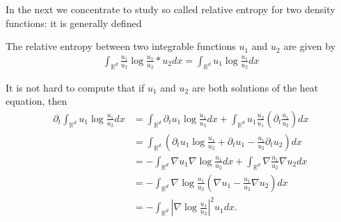 In the next we concentrate to study so called relative entropy for two density functions: it is generally defined
\begin{definition}
The relative entropy between two integrable functions $u_1$ and $u_{2}$ are given by
\begin{align*}
\int_{\mathbb{R}^{d} }\frac{u_{1}}{u_{2}} \log \frac{u_{1}}{u_{2}}*u_{2} dx=\int_{\mathbb{R}^{d} }{u_{1}} \log \frac{u_{1}}{u_{2}} dx
\end{align*}
\end{definition}
\begin{remark}
	It is not hard to compute that if $u_1$ and $u_2$ are both solutions of the heat equation, then
\begin{align*}
   \partial_t \int_{\mathbb{R}^{d} } u_{1} \log \frac{u_{1}}{u_{2}}dx&= \int_{\mathbb{R}^{d} } \partial_t u_{1} \log \frac{u_{1}}{u_{2}}dx + \int_{\mathbb{R}^{d} } u_{1} \frac{u_{2}}{u_{1}}(\partial_t \frac{u_{1}}{u_{2}})dx \\
   &=\int_{\mathbb{R}^{d} } (\partial_t u_{1} \log \frac{u_{1}}{u_{2}}+\partial_t u_1-\frac{u_{1}}{u_{2}}\partial_t u_2 ) dx\\
   &=- \int_{\mathbb{R}^{d} } \nabla u_{1} \nabla\log \frac{u_{1}}{u_{2}}dx+ \int_{\mathbb{R}^{d} } \nabla\frac{u_{1}}{u_{2}}\nabla u_2 dx\\
   &=- \int_{\mathbb{R}^{d} } \nabla\log\frac{u_{1}}{u_{2}}(\nabla u_1-\frac{u_1}{u_2}\nabla u_2) dx\\
   &=- \int_{\mathbb{R}^{d} } |\nabla\log\frac{u_{1}}{u_{2}}|^2 u_1 dx
 .\end{align*}
\end{remark}


